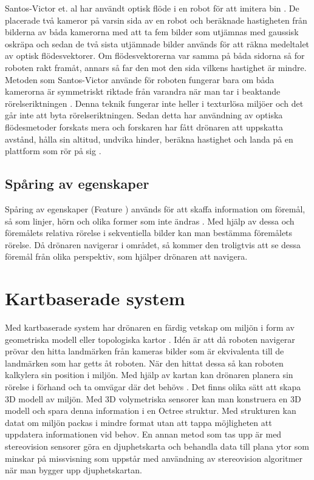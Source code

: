 Santos-Victor et. al har användt optisk flöde i en robot för att imitera bin \citep{341094}. De placerade två kameror på varsin sida av en robot och beräknade hastigheten från bilderna av båda kamerorna med att ta fem bilder som utjämnas med gaussisk oskräpa och sedan de två sista utjämnade bilder används för att räkna medeltalet av optisk flödesvektorer. Om flödesvektorerna var samma på båda sidorna så for roboten rakt framåt, annars så far den mot den sida vilkens hastighet är mindre. Metoden som Santos-Victor använde för roboten fungerar bara om båda kamerorna är symmetriskt riktade från varandra när man tar i beaktande rörelseriktningen \citep{982903}. Denna teknik fungerar inte heller i texturlösa miljöer och det går inte att byta rörelseriktningen. Sedan detta har användning av optiska flödesmetoder forskats mera och forskaren har fått drönaren att uppskatta avstånd, hålla sin altitud, undvika hinder, beräkna hastighet och landa på en plattform som rör på sig \citep{6564752}.

\subsection{Spåring av egenskaper}

Spåring av egenskaper (Feature ) används för att skaffa information om föremål, så som linjer, hörn och olika former som inte ändras \citep{geospatial}. Med hjälp av dessa och föremålets relativa rörelse i sekventiella bilder kan man bestämma föremålets rörelse. Då drönaren navigerar i området, så kommer den troligtvis att se dessa föremål från olika perspektiv, som hjälper drönaren att navigera.

\section{Kartbaserade system}

Med kartbaserade system har drönaren en färdig vetskap om miljön i form av geometriska modell eller topologiska kartor \citep{982903}. Idén är att då roboten navigerar prövar den hitta landmärken från kameras bilder som är ekvivalenta till de landmärken som har getts åt roboten. När den hittat dessa så kan roboten kalkylera sin position i miljön. Med hjälp av kartan kan drönaren planera sin rörelse i förhand och ta omvägar där det behövs \citep{geospatial}. Det finns olika sätt att skapa 3D modell av miljön. Med 3D volymetriska sensorer kan man konstruera en 3D modell och spara denna information i en Octree struktur. Med strukturen kan datat om miljön packas i mindre format utan att tappa möjligheten att uppdatera informationen vid behov. En annan metod som tas upp är med stereovision sensorer göra en djuphetskarta och behandla data till plana ytor som minskar på missvisning som uppstår med användning av stereovision algoritmer när man bygger upp djuphetskartan.

